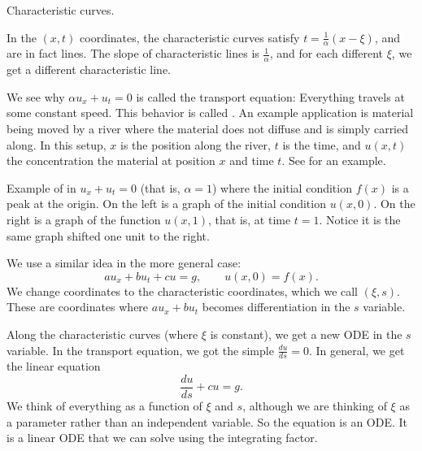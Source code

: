 \begin{example}
\begin{mywrapfig}{2.8in}
\capstart
{}
\caption{Characteristic curves.\label{fopde:charcurves}}
\end{mywrapfig}

In the $(x,t)$ coordinates, the characteristic curves satisfy 
$t = \frac{1}{\alpha} ( x- \xi)$, and are in fact lines.
The slope of characteristic lines is
$\frac{1}{\alpha}$, and for each different $\xi$, we get a different
characteristic line.

We see why $\alpha u_x + u_t = 0$ is called the
transport equation: Everything travels at some constant speed.
This behavior is called \emph{}.
An example application is material being moved by a river where the material
does not diffuse and is simply carried along.  In this setup, $x$ is 
the position along the river, $t$ is the time, and $u(x,t)$ the concentration the
material at position $x$ and time $t$.  See
 for an example.
\begin{myfig}
\capstart
\caption{Example of 
in $u_x+u_t = 0$ (that is, $\alpha = 1$) where the
initial condition $f(x)$ is a peak at the origin.  On the left is a graph
of the initial condition $u(x,0)$.  On the right is a graph of
the function $u(x,1)$, that is, at time $t=1$.  Notice it is the same
graph shifted one unit to
the right.\label{fopde:transportfig}}
\end{myfig}
\end{example}

We use a similar idea in the more general case:
\begin{equation*}
a u_x + b u_t + c u = g, \qquad u(x,0) = f(x)  .
\end{equation*}
We change coordinates to the
characteristic coordinates, which we call $(\xi,s)$.
These are coordinates where $a u_x + b u_t$ becomes differentiation
in the $s$ variable.

Along the characteristic curves (where $\xi$ is constant), we get a
new ODE in the $s$ variable.  In the transport
equation, we got the simple $\frac{du}{ds} = 0$.  In general,
we get the linear equation
\begin{equation} \label{eq:fopde:charode}
\frac{du}{ds} + c u = g.
\end{equation}
We think of everything as a function of $\xi$ and $s$,
although
we are thinking of $\xi$ as a parameter rather than an independent variable.
So the equation is an ODE\@.  It is a linear
ODE that we can solve using the integrating factor.

